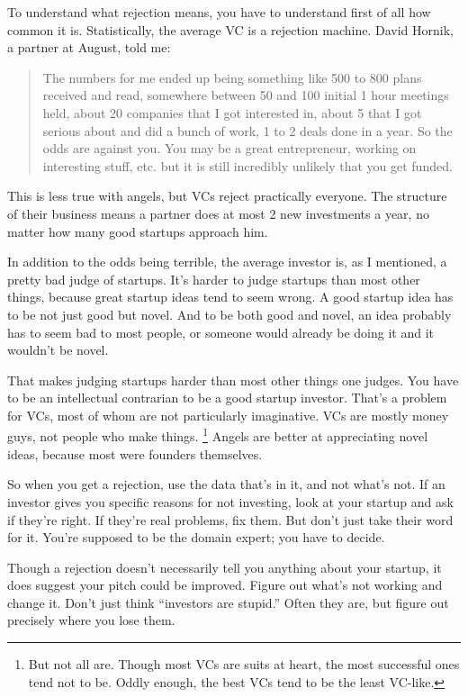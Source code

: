 \documentclass[12pt]{book}
\begin{document}
To understand what rejection means, you have to understand first of all
how common it is. Statistically, the average VC is a rejection machine.
David Hornik, a partner at August, told me:

\begin{quote}
The numbers for me ended up being something like 500 to 800 plans
received and read, somewhere between 50 and 100 initial 1 hour meetings
held, about 20 companies that I got interested in, about 5 that I got
serious about and did a bunch of work, 1 to 2 deals done in a year. So
the odds are against you. You may be a great entrepreneur, working on
interesting stuff, etc. but it is still incredibly unlikely that you get
funded.
\end{quote}

This is less true with angels, but VCs reject practically everyone. The
structure of their business means a partner does at most 2 new
investments a year, no matter how many good startups approach him.

In addition to the odds being terrible, the average investor is, as I
mentioned, a pretty bad judge of startups. It's harder to judge startups
than most other things, because great startup ideas tend to seem wrong.
A good startup idea has to be not just good but novel. And to be both
good and novel, an idea probably has to seem bad to most people, or
someone would already be doing it and it wouldn't be novel.

That makes judging startups harder than most other things one judges.
You have to be an intellectual contrarian to be a good startup investor.
That's a problem for VCs, most of whom are not particularly imaginative.
VCs are mostly money guys, not people who make things.
\footnote{But not all are. Though most VCs are suits at heart, the most
successful ones tend not to be. Oddly enough, the best VCs tend to be
the least VC-like.} Angels are better at appreciating novel ideas,
because most were founders themselves.

So when you get a rejection, use the data that's in it, and not what's
not. If an investor gives you specific reasons for not investing, look
at your startup and ask if they're right. If they're real problems, fix
them. But don't just take their word for it. You're supposed to be the
domain expert; you have to decide.

Though a rejection doesn't necessarily tell you anything about your
startup, it does suggest your pitch could be improved. Figure out what's
not working and change it. Don't just think ``investors are stupid.''
Often they are, but figure out precisely where you lose them.
\end{document}
